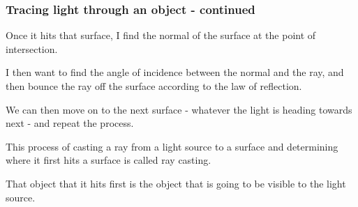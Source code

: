 \documentclass[12pt]{beamer}
\begin{document}
  \begin{frame}
    \frametitle{Tracing light through an object - continued}
    Once it hits that surface, I find the normal of the surface at the point of intersection.


    I then want to find the angle of incidence between the normal and the ray, and then bounce the ray off the surface according to the law of reflection.


    We can then move on to the next surface - whatever the light is heading towards next - and repeat the process.

    This process of casting a ray from a light source to a surface and determining where it first hits a surface is called ray casting.

    That object that it hits first is the object that is going to be visible to the light source.

  \end{frame}
\end{document}
